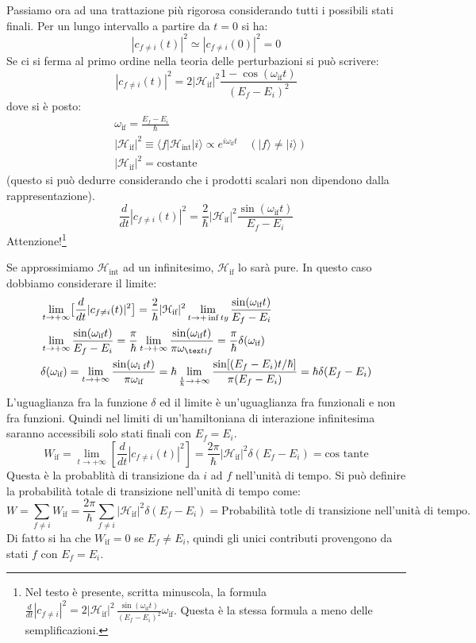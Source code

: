 Passiamo ora ad una trattazione più rigorosa considerando tutti i possibili 
stati finali. Per un lungo intervallo a partire da $t=0$ si ha:
\[
|c_{f\neq i}(t)|^2\simeq |c_{f\neq i}(0)|^2=0
\]
Se ci si ferma al primo ordine nella teoria delle perturbazioni si può 
scrivere:
\[
|c_{f\neq 
i}(t)|^2=2|\mathcal{H}_{\text{if}}|^2\frac{1-\cos(\omega_{\text{if}}t)}{(E_f-E_i
)^2}
\]
dove si è posto:
\begin{align*}
&\omega_{\text{if}}=\frac{E_f-E_i}{\hbar}\\
&|\mathcal{H}_{\text{if}}|^2\equiv\langle 
f|\mathcal{H}_{\text{int}}|i\rangle\propto e^{i\omega_{\text{if}}t}\quad 
(|f\rangle\neq|i\rangle)\\
&|\mathcal{H}_{\text{if}}|^2=\text{costante}
\end{align*}
(questo si può dedurre considerando che i prodotti scalari non dipendono dalla 
rappresentazione).
\[
\frac{d}{dt}|c_{f\neq 
i}(t)|^2=\frac{2}{\hbar}|\mathcal{H}_{\text{if}}|^2\frac{\sin(\omega_{\text{if}}
t)}{E_f-E_i}
\]
Attenzione!\footnote{Nel testo è presente, scritta minuscola, la formula
  $\frac{d}{dt}|c_{f\neq
  
i}|^2=2|\mathcal{H}_{\text{if}}|^2\,\frac{\sin(\omega_{\text{if}}t)}{(E_f-E_i)^2
}\omega_{\text{if}}$.
Questa è la stessa formula a meno delle semplificazioni.}

Se approssimiamo $\mathcal{H}_{\text{int}}$ ad un infinitesimo, 
$\mathcal{H}_{\text{if}}$ lo sarà pure.
In questo caso dobbiamo considerare il limite:
\begin{align*}
&\lim_{t\rightarrow+\infty}\bigl[\frac{d}{dt}|c_{f\neq 
i}(t)|^2\bigr]=\frac{2}{\hbar}|\mathcal{H}_{\text{if}}|^2\lim_{t\rightarrow+\inf
ty}\frac{\sin(\omega_{\text{if}}t)}{E_f-E_i}\\
&\lim_{t\rightarrow+\infty}\frac{\sin(\omega_{\text{if}}t)}{E_f-E_i}=\frac{\pi}{
\hbar}\lim_{t\rightarrow+\infty}\frac{\sin(\omega_{\text{if}}t)}{\pi\omega_{\tex
t{if}}}=\frac{\pi}{\hbar}\delta(\omega_{\text{if}})\\
&\delta(\omega_{\text{if}})=\lim_{t\rightarrow+\infty}\frac{\sin(\omega_{\text{i
f}}t)}{\pi\omega_{\text{if}}}=\hbar\lim_{\frac{t}{\hbar}\rightarrow+\infty}\frac
{\sin[(E_f-E_i)t/\hbar]}{\pi(E_f-E_i)}=\hbar\delta(E_f-E_i)
\end{align*}
L'uguaglianza fra la funzione $\delta$ ed il limite è un'uguaglianza fra 
funzionali e non fra funzioni.
Quindi nel limiti di un'hamiltoniana di interazione 
infinitesima saranno accessibili solo stati finali con $E_f=E_i$.
\[
W_{\text{if}}=\lim_{t\rightarrow+\infty}[\frac{d}{dt}|c_{f\neq 
i}(t)|^2]=\frac{2\pi}{\hbar}|\mathcal{H}_{\text{if}}|^2\delta(E_f-E_i)=\text{cos
tante}
\]
Questa è la probablità di transizione  da $i$ ad $f$ nell'unità di tempo. Si 
può definire la probabilità totale di transizione nell'unità di tempo come:
\[
W=\sum_{f\neq i}W_{\text{if}}=\frac{2\pi}{\hbar}\sum_{f\neq 
i}|\mathcal{H}_{\text{if}}|^2\delta(E_f-E_i)=\text{Probabilità totle di 
transizione nell'unità di tempo.}
\]
Di fatto si ha che $W_{\text{if}}=0$ se $E_f\neq E_i$, quindi gli unici 
contributi provengono da stati $f$ con $E_f=E_i$.

